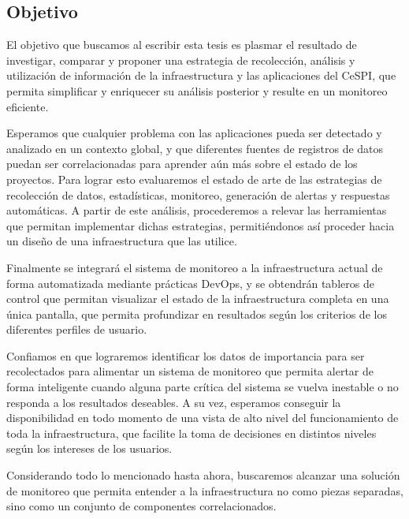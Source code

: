 \subsection{Objetivo}
\label{objetivo}

El objetivo que buscamos al escribir esta tesis es plasmar el resultado de investigar, comparar y proponer una estrategia de recolección, análisis y utilización de información de la infraestructura y las aplicaciones del CeSPI, que permita simplificar y enriquecer su análisis posterior y resulte en un monitoreo eficiente.

Esperamos que cualquier problema con las aplicaciones pueda ser detectado y analizado en un contexto global, y que diferentes fuentes de registros de datos puedan ser correlacionadas para aprender aún más sobre el estado de los proyectos.
Para lograr esto evaluaremos el estado de arte de las estrategias de recolección de datos, estadísticas, monitoreo, generación de alertas y respuestas automáticas. A partir de este análisis, procederemos a relevar las herramientas que permitan implementar dichas estrategias, permitiéndonos así proceder hacia un diseño de una infraestructura que las utilice.

Finalmente se integrará el sistema de monitoreo a la infraestructura actual de forma automatizada mediante prácticas DevOps, y se obtendrán tableros de control que permitan visualizar el estado de la infraestructura completa en una única pantalla, que permita profundizar en resultados según los criterios de los diferentes perfiles de usuario.

Confiamos en que lograremos identificar los datos de importancia para ser recolectados para alimentar un sistema de monitoreo que permita alertar de forma inteligente cuando alguna parte crítica del sistema se vuelva inestable o no responda a los resultados deseables. A su vez, esperamos conseguir la disponibilidad en todo momento de una vista de alto nivel del funcionamiento de toda la infraestructura, que facilite la toma de decisiones en distintos niveles según los intereses de los usuarios.

Considerando todo lo mencionado hasta ahora, buscaremos alcanzar una solución de monitoreo que permita entender a la infraestructura no como piezas separadas, sino como un conjunto de componentes correlacionados.
